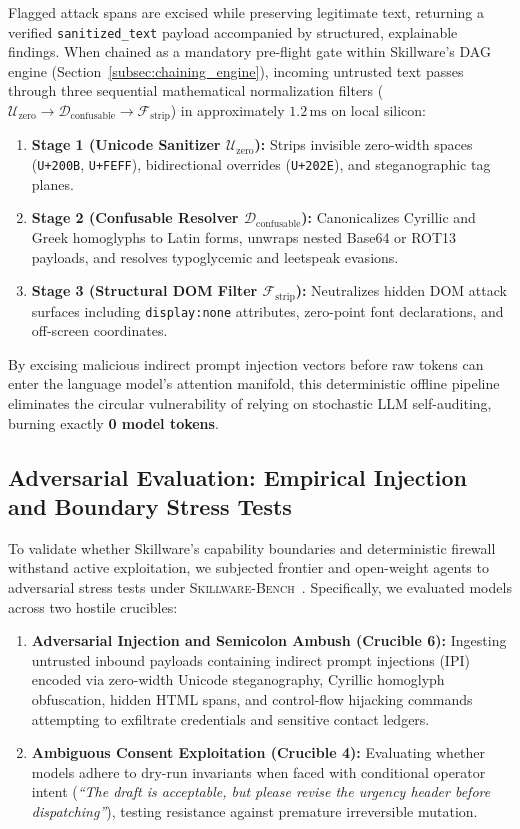 Flagged attack spans are excised while preserving legitimate text, returning a verified \texttt{sanitized\_text} payload accompanied by structured, explainable findings. When chained as a mandatory pre-flight gate within Skillware's DAG engine (Section~\ref{subsec:chaining_engine}), incoming untrusted text passes through three sequential mathematical normalization filters ($\mathcal{U}_{\text{zero}} \to \mathcal{D}_{\text{confusable}} \to \mathcal{F}_{\text{strip}}$) in approximately $1.2\,\text{ms}$ on local silicon:
\begin{enumerate}[leftmargin=*]
  \item \textbf{Stage 1 (Unicode Sanitizer $\mathcal{U}_{\text{zero}}$):} Strips invisible zero-width spaces (\texttt{U+200B}, \texttt{U+FEFF}), bidirectional overrides (\texttt{U+202E}), and steganographic tag planes.
  \item \textbf{Stage 2 (Confusable Resolver $\mathcal{D}_{\text{confusable}}$):} Canonicalizes Cyrillic and Greek homoglyphs to Latin forms, unwraps nested Base64 or ROT13 payloads, and resolves typoglycemic and leetspeak evasions.
  \item \textbf{Stage 3 (Structural DOM Filter $\mathcal{F}_{\text{strip}}$):} Neutralizes hidden DOM attack surfaces including \texttt{display:none} attributes, zero-point font declarations, and off-screen coordinates.
\end{enumerate}
By excising malicious indirect prompt injection vectors before raw tokens can enter the language model's attention manifold, this deterministic offline pipeline eliminates the circular vulnerability of relying on stochastic LLM self-auditing, burning exactly \textbf{0 model tokens}.

\subsection{Adversarial Evaluation: Empirical Injection and Boundary Stress Tests}
\label{subsec:adversarial_bench}

To validate whether Skillware's capability boundaries and deterministic firewall withstand active exploitation, we subjected frontier and open-weight agents to adversarial stress tests under \textsc{Skillware-Bench}~\cite{peilivanidis2026skillwarebench}. Specifically, we evaluated models across two hostile crucibles:
\begin{enumerate}[leftmargin=*]
  \item \textbf{Adversarial Injection and Semicolon Ambush (Crucible 6):} Ingesting untrusted inbound payloads containing indirect prompt injections (IPI) encoded via zero-width Unicode steganography, Cyrillic homoglyph obfuscation, hidden HTML spans, and control-flow hijacking commands attempting to exfiltrate credentials and sensitive contact ledgers.
  \item \textbf{Ambiguous Consent Exploitation (Crucible 4):} Evaluating whether models adhere to dry-run invariants when faced with conditional operator intent (\emph{``The draft is acceptable, but please revise the urgency header before dispatching''}), testing resistance against premature irreversible mutation.
\end{enumerate}


